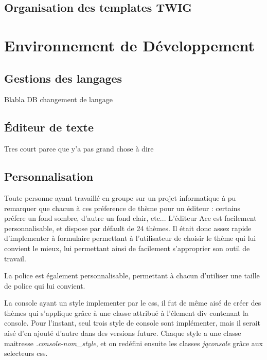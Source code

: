 
\subsection{Organisation des templates TWIG}

\section{Environnement de Développement}

\subsection{Gestions des langages}
Blabla DB changement de langage

\subsection{Éditeur de texte}
Tres court parce que y'a pas grand chose à dire

\subsection{Personnalisation}

Toute personne ayant travaillé en groupe sur un projet informatique à pu remarquer que chacun à ces préference de thème pour un éditeur : certains préfere un fond sombre, d'autre un fond clair, etc...
L'éditeur Ace est facilement personnalisable, et dispose par défault de 24 thèmes. Il était donc assez rapide d'implementer à formulaire permettant à l'utilisateur de choisir le thème qui lui convient le mieux,
lui permettant ainsi de facilement s'approprier son outil de travail.

La police est également personnalisable, permettant à chacun d'utiliser une taille de police qui lui convient.

La console ayant un style implementer par le css, il fut de même aisé de créer des thèmes qui s'applique grâce à une classe attribué à l'élement div contenant la console.
Pour l'instant, seul trois style de console sont implémenter, mais il serait aisé d'en ajouté d'autre dans des versions future.
Chaque style a une classe maitresse \emph{.console-nom\_style}, et on redéfini ensuite les classes \emph{jqconsole} grâce aux selecteurs css.


